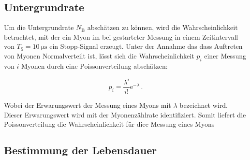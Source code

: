 \subsection{Untergrundrate}
\label{subsec:underground}

Um die Untergrundrate $N_\text{B}$ abschätzen zu können, wird die Wahrscheinlichkeit betrachtet, mit der ein Myon im bei gestarteter Messung in
einem Zeitintervall von $T_\text{S} = \SI{10}{\micro \second}$ ein Stopp-Signal erzeugt. Unter der Annahme das dass Auftreten von Myonen Normalverteilt ist,
lässt sich die Wahrscheinlichkeit $p_i$ einer Messung von $i$ Myonen durch eine Poissonverteilung abschätzen:

\begin{equation*}
p_i = \frac{\lambda^i}{i!}\mathrm{e}^{-\lambda}\,.
\end{equation*}

Wobei der Erwarungswert der Messung eines Myons mit $\lambda$ bezeichnet wird. Dieser Erwarungswert wird mit der Myonenzählrate identifiziert. Somit liefert die Poissonverteilung die Wahrscheinlichkeit
für diee Messung eines Myons
\subsection{Bestimmung der Lebensdauer}
\label{subsec:lifetime}
